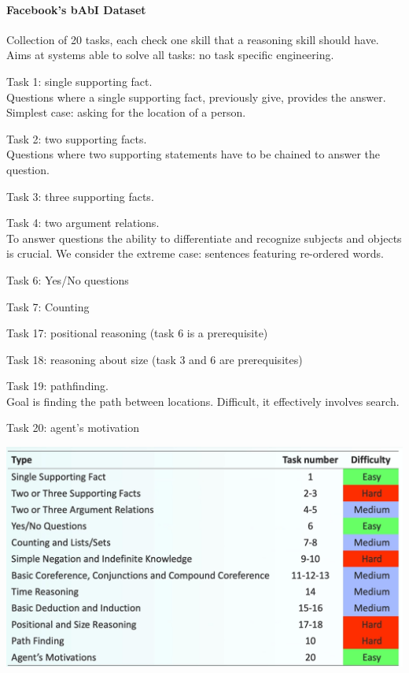 \documentclass[10pt]{report}
\begin{document}
\paragraph{Facebook's bAbI Dataset} Collection of 20 tasks, each check one skill that a reasoning skill should have. Aims at systems able to solve all tasks: no task specific engineering.
\begin{list}{}{}
	\item Task 1: single supporting fact.\\
	Questions where a single supporting fact, previously give, provides the answer. Simplest case: asking for the location of a person.
	\item Task 2: two supporting facts.\\
	Questions where two supporting statements have to be chained to answer the question.
	\item Task 3: three supporting facts.
	\item Task 4: two argument relations.\\
	To answer questions the ability to differentiate and recognize subjects and objects is crucial. We consider the extreme case: sentences featuring re-ordered words.
	\item Task 6: Yes/No questions
	\item Task 7: Counting
	\item Task 17: positional reasoning (task 6 is a prerequisite)
	\item Task 18: reasoning about size (task 3 and 6 are prerequisites)
	\item Task 19: pathfinding.\\
	Goal is finding the path between locations. Difficult, it effectively involves search.
	\item Task 20: agent's motivation
\end{list}
\begin{center}
	\includegraphics[scale=0.5]{97.png}
\end{center}
\end{document}
